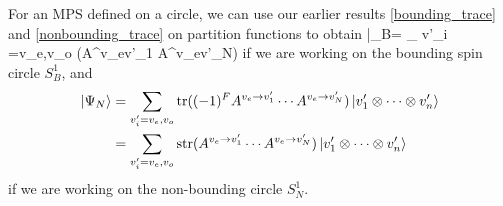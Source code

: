 For an MPS defined on a circle, we can use our earlier results \eqref{bounding_trace} and \eqref{nonbounding_trace} on 
partition functions to obtain 
\be |\Psi_B\rangle = \sum_{ v'_i =v_e,v_o }\tr(A^{v_e\ra v'_1} \cdots A^{v_e\ra v'_N})  \ee
if we are working on the bounding spin circle $S^1_B$, and 
\begin{align}
 |\Psi_N\rangle & = \sum_{v'_i =v_e,v_o  }\text{tr}((-1)^FA^{v_e\rightarrow v'_1} \cdots A^{v_e\rightarrow v'_N}) \left|v'_1 \otimes \cdots \otimes v'_n\right\rangle \\ 
 & =\sum_{v'_i =v_e,v_o }\text{str}(A^{v_e\rightarrow v'_1} \cdots A^{v_e\rightarrow v'_N}) \left|v'_1 \otimes \cdots \otimes v'_n\right\rangle 
 \end{align}
if we are working on the non-bounding circle $S^1_N$. 


